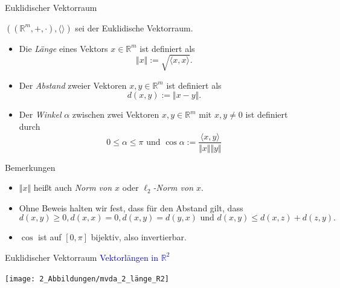 \documentclass[
  8pt,
  ignorenonframetext,
]{beamer}
\providecommand{\tightlist}{%
  \setlength{\itemsep}{0pt}\setlength{\parskip}{0pt}}
\begin{document}
\begin{frame}{Euklidischer Vektorraum}
\protect\hypertarget{euklidischer-vektorraum-3}{}
\small
\begin{definition}
$\left((\mathbb{R}^m, +, \cdot), \langle \rangle \right)$ sei der Euklidische Vektorraum.
\begin{itemize}
\item Die \textit{Länge} eines Vektors $x \in \mathbb{R}^m$ ist definiert als
\begin{equation}
\Vert x \Vert := \sqrt{\langle x, x \rangle}.
\end{equation}
\item Der \textit{Abstand} zweier Vektoren $x,y \in \mathbb{R}^m$ ist definiert als
\begin{equation}
d(x,y) := \Vert x - y \Vert.
\end{equation}
\item Der \textit{Winkel} $\alpha$ zwischen zwei Vektoren $x,y \in \mathbb{R}^m$ mit
$x,y \neq 0$ ist definiert durch
\begin{equation}
0 \le \alpha \le \pi \mbox{ und } \cos \alpha
:= \frac{\langle x, y \rangle}{\Vert x \Vert \Vert y \Vert}
\end{equation}
\end{itemize}
\end{definition}

\footnotesize

Bemerkungen

\begin{itemize}
\tightlist
\item
  \(\Vert x \Vert\) heißt auch \emph{Norm von \(x\)} oder
  \emph{\(\ell_2\)-Norm von \(x\)}.
\item
  Ohne Beweis halten wir fest, dass für den Abstand gilt, dass
  \begin{equation}
  d(x,y) \ge 0, d(x,x) = 0, d(x,y) = d(y,x) \mbox{ und } d(x,y) \le d(x,z) + d(z,y).
  \end{equation}
\item
  \(\cos\) ist auf \([0,\pi]\) bijektiv, also invertierbar.
\end{itemize}
\end{frame}

\begin{frame}{Euklidischer Vektorraum}
\protect\hypertarget{euklidischer-vektorraum-4}{}
\textcolor{darkblue}{Vektorlängen in $\mathbb{R}^2$}

\begin{center}\texttt{[image: 2\_Abbildungen/mvda\_2\_länge\_R2]} \end{center}
\end{frame}
\end{document}

